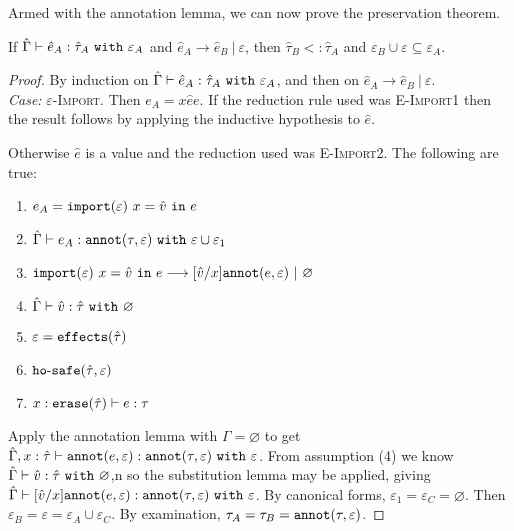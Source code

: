 Armed with the annotation lemma, we can now prove the preservation theorem.

\begin{theorem}[Preservation]
If $\hat \Gamma \vdash \hat e_A: \hat \tau_A~\mathtt{with}~ \varepsilon_A$ and $\hat e_A \longrightarrow \hat e_B~|~\varepsilon$, then $\hat \tau_B <: \hat \tau_A$ and $\varepsilon_B \cup \varepsilon \subseteq \varepsilon_A$.
\end{theorem}

\begin{proof} By induction on $\hat \Gamma \vdash \hat e_A: \hat \tau_A~\mathtt{with}~ \varepsilon_A$, and then on $\hat e_A \longrightarrow \hat e_B~|~\varepsilon$. \\

\textit{Case:} \textsc{$\varepsilon$-Import}. Then $e_A = {x}{\hat e}{e}$. If the reduction rule used was \textsc{E-Import1} then the result follows by applying the inductive hypothesis to $\hat e$.

Otherwise $\hat e$ is a value and the reduction used was \textsc{E-Import2}. The following are true:
\begin{enumerate}
	\setlength\itemsep{-0.7em}
	\item $e_A = \mathtt{import}(\varepsilon)~x = \hat v~\mathtt{in}~ e$
	\item $\hat \Gamma \vdash e_A: \mathtt{annot}(\tau, \varepsilon)~\mathtt{with}~ \varepsilon \cup \varepsilon_1$
	\item $\mathtt{import}(\varepsilon)~x = \hat v~\mathtt{in}~ e \longrightarrow [\hat v/x]\mathtt{annot}(e, \varepsilon)~|~\varnothing$
	\item $\hat \Gamma \vdash \hat v: \hat \tau~\mathtt{with}~ \varnothing$
	\item $\varepsilon = \mathtt{effects}(\hat \tau)$
	\item $\mathtt{ho \hbox{-} safe}(\hat \tau, \varepsilon)$
	\item $x: \mathtt{erase}(\hat \tau) \vdash e: \tau$
\end{enumerate}

\noindent
Apply the annotation lemma with $\Gamma = \varnothing$ to get $\hat \Gamma, x: \hat \tau \vdash \mathtt{annot}(e, \varepsilon): \mathtt{annot}(\tau, \varepsilon)~\mathtt{with}~ \varepsilon$. From assumption (4) we know $\hat \Gamma \vdash \hat v: \hat \tau~\mathtt{with}~ \varnothing$,n so the substitution lemma may be applied, giving $\hat \Gamma \vdash [\hat v/x]\mathtt{annot}(e, \varepsilon): \mathtt{annot}(\tau, \varepsilon)~\mathtt{with}~ \varepsilon$. By canonical forms, $\varepsilon_1 = \varepsilon_C = \varnothing$. Then $\varepsilon_B = \varepsilon = \varepsilon_A \cup \varepsilon_C$. By examination, $\tau_A = \tau_B = \mathtt{annot}(\tau, \varepsilon)$.
\end{proof}

